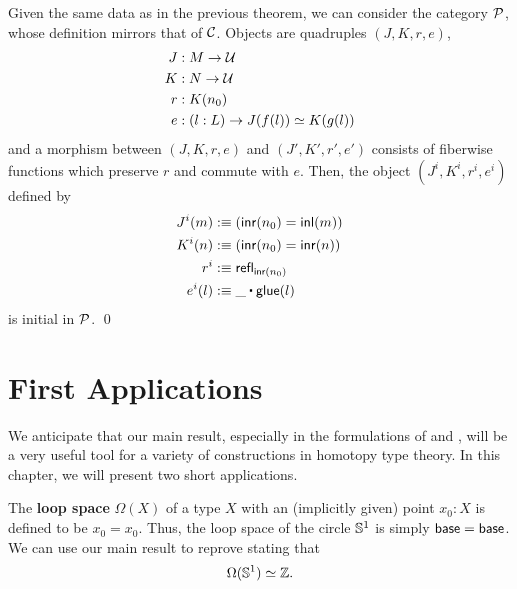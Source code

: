 \begin{thm} \label{thm:paths-mainresult-pushout-based}
 Given the same data as in the previous theorem, we can consider the category $\mathcal P$,
 whose definition mirrors that of $\mathcal C$.
 Objects are quadruples $(J,K,r,e)$,
 \begin{align*}
  J &: M \to \mathcal{U} \\
  K &: N \to \mathcal{U} \\
  r &: K(n_0) \\
  e &: (l : L) \to J(f(l)) \simeq K(g(l))
 \end{align*}
and a morphism between $(J,K,r,e)$ and $(J',K',r',e')$ consists of fiberwise
functions which preserve $r$ and commute with $e$. %
  Then, the object $(J^i,K^i,r^i,e^i)$ defined by
 \begin{align*}
  J^i(m) &:\equiv \left(\inr(n_0) = \inl(m)\right) \\
  K^i(n) &:\equiv \left(\inr(n_0) = \inr(n)\right) \\
  r^i &:\equiv \refl_{\inr(n_0)} \\
  e^i(l) &:\equiv \_ \ct \glue(l)
 \end{align*}
is initial in $\mathcal P$. \qed
\end{thm}

\section{First Applications}\label{sec:paths-applications}

We anticipate that our main result, especially in the formulations of
 and ,
will be a very useful tool for a variety of constructions
in homotopy type theory.
In this chapter, we will present two short applications.

The \textbf{loop space} $\Omega(X)$ of a type $X$ with an (implicitly given)
point $x_0 : X$ is defined to be $x_0 = x_0$.
Thus, the loop space of the circle $\mathbb{S}^1$ is simply
$\mathsf{base} = \mathsf{base}$.
We can use our main result to reprove  stating that
\begin{equation*}
\Omega(\mathbb{S}^1) \simeq \mathbb Z \text{.}
\end{equation*}

